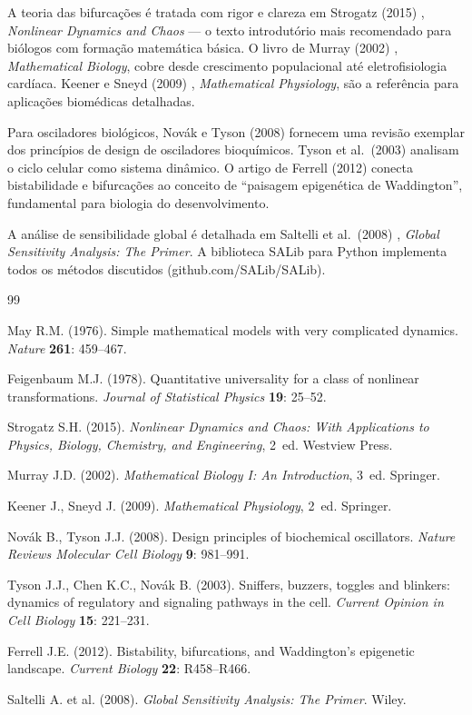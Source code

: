 A teoria das bifurcações é tratada com rigor e clareza em Strogatz (2015)
\cite{strogatz2015}, \textit{Nonlinear Dynamics and Chaos} --- o texto introdutório mais
recomendado para biólogos com formação matemática básica. O livro de Murray (2002)
\cite{murray2002}, \textit{Mathematical Biology}, cobre desde crescimento populacional até
eletrofisiologia cardíaca. Keener e Sneyd (2009) \cite{keener2009}, \textit{Mathematical
Physiology}, são a referência para aplicações biomédicas detalhadas.

Para osciladores biológicos, Novák e Tyson (2008) \cite{novak2008} fornecem uma revisão
exemplar dos princípios de design de osciladores bioquímicos. Tyson et al.\ (2003)
\cite{tyson2003} analisam o ciclo celular como sistema dinâmico. O artigo de Ferrell (2012)
\cite{ferrell2012} conecta bistabilidade e bifurcações ao conceito de ``paisagem epigenética
de Waddington'', fundamental para biologia do desenvolvimento.

A análise de sensibilidade global é detalhada em Saltelli et al.\ (2008)
\cite{saltelli2008}, \textit{Global Sensitivity Analysis: The Primer}. A biblioteca SALib
para Python implementa todos os métodos discutidos (github.com/SALib/SALib).

\begin{thebibliography}{99}

May R.M. (1976).
Simple mathematical models with very complicated dynamics.
\textit{Nature} \textbf{261}: 459--467.

Feigenbaum M.J. (1978).
Quantitative universality for a class of nonlinear transformations.
\textit{Journal of Statistical Physics} \textbf{19}: 25--52.

Strogatz S.H. (2015).
\textit{Nonlinear Dynamics and Chaos: With Applications to Physics, Biology, Chemistry,
and Engineering}, 2\textordfeminine\ ed.
Westview Press.

Murray J.D. (2002).
\textit{Mathematical Biology I: An Introduction}, 3\textordfeminine\ ed.
Springer.

Keener J., Sneyd J. (2009).
\textit{Mathematical Physiology}, 2\textordfeminine\ ed.
Springer.

Novák B., Tyson J.J. (2008).
Design principles of biochemical oscillators.
\textit{Nature Reviews Molecular Cell Biology} \textbf{9}: 981--991.

Tyson J.J., Chen K.C., Novák B. (2003).
Sniffers, buzzers, toggles and blinkers: dynamics of regulatory and signaling pathways
in the cell.
\textit{Current Opinion in Cell Biology} \textbf{15}: 221--231.

Ferrell J.E. (2012).
Bistability, bifurcations, and Waddington's epigenetic landscape.
\textit{Current Biology} \textbf{22}: R458--R466.

Saltelli A. et al. (2008).
\textit{Global Sensitivity Analysis: The Primer}.
Wiley.

\end{thebibliography}
